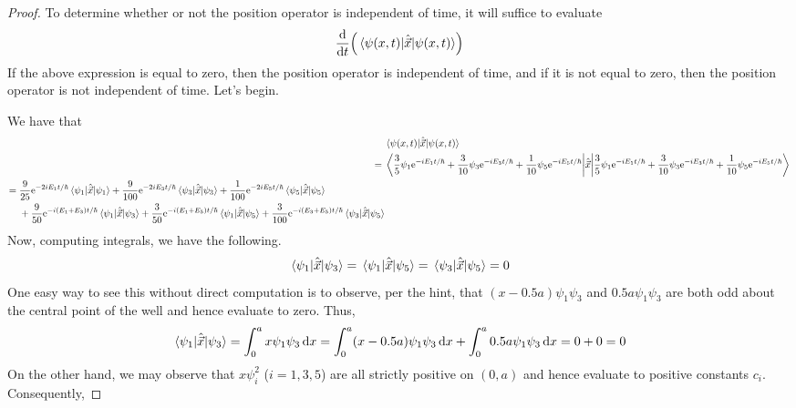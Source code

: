 \documentclass[../psets.tex]{subfiles}
\begin{document}
\begin{enumerate}
\begin{enumerate}
\begin{proof}
            To determine whether or not the position operator is independent of time, it will suffice to evaluate
            \begin{equation*}
                \dv{t}(\ev{\hat{\vec{x}}}{\psi(x,t)})
            \end{equation*}
            If the above expression is equal to zero, then the position operator is independent of time, and if it is not equal to zero, then the position operator is not independent of time. Let's begin.\par
            We have that
            \begin{align*}
                & \ev{\hat{\vec{x}}}{\psi(x,t)}\\
                ={}& \ev{\hat{\vec{x}}}{\frac{3}{5}\psi_1\e[-iE_1t/\hbar]+\frac{3}{10}\psi_3\e[-iE_3t/\hbar]+\frac{1}{10}\psi_5\e[-iE_5t/\hbar]}\\
                \begin{split}
                    ={}& \frac{9}{25}\e[-2iE_1t/\hbar]\ev{\hat{\vec{x}}}{\psi_1}+\frac{9}{100}\e[-2iE_3t/\hbar]\ev{\hat{\vec{x}}}{\psi_3}+\frac{1}{100}\e[-2iE_5t/\hbar]\ev{\hat{\vec{x}}}{\psi_5}\\
                    & +\frac{9}{50}\e[-i(E_1+E_3)t/\hbar]\mel{\psi_1}{\hat{\vec{x}}}{\psi_3}+\frac{3}{50}\e[-i(E_1+E_5)t/\hbar]\mel{\psi_1}{\hat{\vec{x}}}{\psi_5}+\frac{3}{100}\e[-i(E_3+E_5)t/\hbar]\mel{\psi_3}{\hat{\vec{x}}}{\psi_5}
                \end{split}
            \end{align*}
            Now, computing integrals, we have the following.
            \begin{equation*}
                \mel{\psi_1}{\hat{\vec{x}}}{\psi_3}
                = \mel{\psi_1}{\hat{\vec{x}}}{\psi_5}
                = \mel{\psi_3}{\hat{\vec{x}}}{\psi_5}
                = 0
            \end{equation*}
            One easy way to see this without direct computation is to observe, per the hint, that $(x-0.5a)\psi_1\psi_3$ and $0.5a\psi_1\psi_3$ are both odd about the central point of the well and hence evaluate to zero. Thus,
            \begin{equation*}
                \mel{\psi_1}{\hat{\vec{x}}}{\psi_3} = \int_0^ax\psi_1\psi_3\dd{x}
                = \int_0^a(x-0.5a)\psi_1\psi_3\dd{x}+\int_0^a0.5a\psi_1\psi_3\dd{x}
                = 0+0
                = 0
            \end{equation*}
            On the other hand, we may observe that $x\psi_i^2$ ($i=1,3,5$) are all strictly positive on $(0,a)$ and hence evaluate to positive constants $c_i$. Consequently,

\end{proof}
\end{enumerate}
\end{enumerate}
\end{document}
